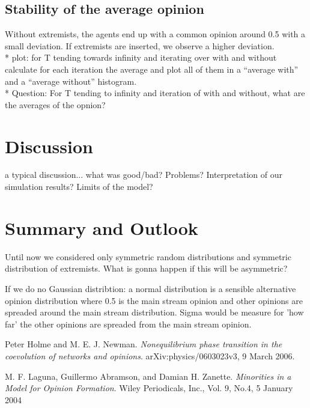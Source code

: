 \documentclass[11pt]{article}
\begin{document}
\subsection{Stability of the average opinion}
Without extremists, the agents end up with a common opinion around 0.5 with a small deviation. If extremists are inserted, we observe a higher deviation. \\*
plot: for T tending towards infinity and iterating over with and without calculate for each iteration the average and plot all of them in a “average with” and a “average without” histogram. \\*
Question: For T tending to infinity and iteration of with and without, what are the averages of the opnion?


\section{Discussion}
a typical discussion... what was good/bad? Problems? Interpretation of our simulation results? Limits of the model?

\section{Summary and Outlook}
Until now we considered only symmetric random distributions and symmetric distribution of extremists. What is gonna happen if this will be asymmetric?


If we do no Gaussian distribtion: a normal distribution is a sensible alternative opinion distribution where 0.5 is the main stream opinion and other opinions are spreaded around the main stream distribution. Sigma would be measure for 'how far' the other opinions are spreaded from the main stream opinion.


\begin{thebibliography}{99}
 Peter Holme and M. E. J. Newman. \textit{Nonequilibrium phase transition in the coevolution of networks and opinions}. arXiv:physics/0603023v3, 9 March 2006.

 M. F. Laguna, Guillermo Abramson, and Damian H. Zanette. \textit{Minorities in a Model for Opinion Formation}. Wiley Periodicals, Inc., Vol. 9, No.4, 5 January 2004

\end{thebibliography} 
\end{document}
